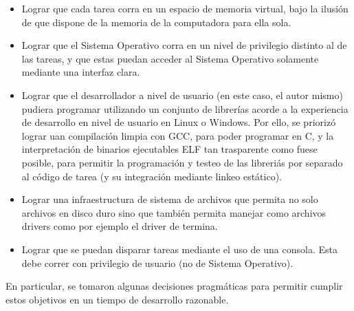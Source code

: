 \begin{itemize}
	\item Lograr que cada tarea corra en un espacio de memoria virtual, bajo
	la ilusi\'on de que dispone de la memoria de la computadora para ella sola.
	\item Lograr que el Sistema Operativo corra en un nivel de privilegio distinto
	al de las tareas, y que estas puedan acceder al Sistema Operativo solamente
	mediante una interfaz clara.
	\item Lograr que el desarrollador a nivel de usuario (en este caso, el autor
	mismo) pudiera programar utilizando un conjunto de librer\'ias acorde a
	la experiencia de desarrollo en nivel de usuario en Linux o Windows. Por ello,
	se prioriz\'o lograr uan compilaci\'on limpia con GCC, para poder programar en C,
	y la interpretaci\'on de binarios ejecutables ELF tan trasparente como fuese posible,
	para permitir la programaci\'on y testeo de las libreri\'as por separado al c\'odigo de
	tarea (y su integraci\'on mediante linkeo est\'atico).
	\item Lograr una infraestructura de sistema de archivos que permita no solo archivos
	en disco duro sino que tambi\'en permita manejar como archivos drivers como por ejemplo
	el driver de termina.
	\item Lograr que se puedan disparar tareas mediante el uso de una consola. Esta debe
	correr con privilegio de usuario (no de Sistema Operativo).
\end{itemize}

En particular, se tomaron algunas decisiones pragm\'aticas para permitir cumplir estos objetivos
en un tiempo de desarrollo razonable.

